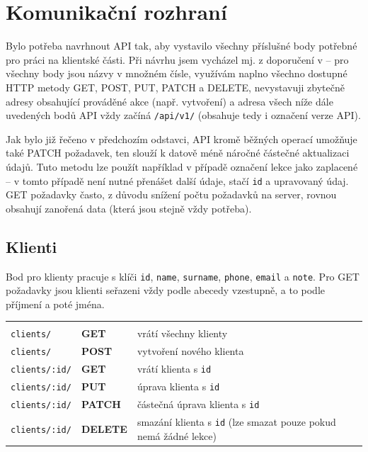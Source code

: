    \section{Komunikační rozhraní}
    Bylo potřeba navrhnout API tak, aby vystavilo všechny příslušné body potřebné pro práci na klientské části. Při návrhu jsem vycházel mj. z doporučení v \cite{api-bestpractises} -- pro všechny body jsou názvy v množném čísle, využívám naplno všechno dostupné HTTP metody GET, POST, PUT, PATCH a DELETE, nevystavuji zbytečně adresy obsahující prováděné akce (např. vytvoření) a adresa všech níže dále uvedených bodů API vždy začíná \verb|/api/v1/| (obsahuje tedy i označení verze API).
    
    Jak bylo již řečeno v předchozím odstavci, API kromě běžných operací umožňuje také PATCH požadavek, ten slouží k datově méně náročné částečné aktualizaci údajů. Tuto metodu lze použít například v případě označení lekce jako zaplacené -- v tomto případě není nutné přenášet další údaje, stačí \verb|id| a upravovaný údaj. GET požadavky často, z důvodu snížení počtu požadavků na server, rovnou obsahují zanořená data (která jsou stejně vždy potřeba).
    
    \newcommand{\apiA}{0.33}
    \newcommand{\apiB}{0.14}
    \newcommand{\apiC}{0.43}
    
        \subsection{Klienti}
        Bod pro klienty pracuje s klíči \verb|id|, \verb|name|, \verb|surname|, \verb|phone|, \verb|email| a \verb|note|.
        Pro GET požadavky jsou klienti seřazeni vždy podle abecedy vzestupně, a to podle příjmení a poté jména.
        
            {\centering
            \begin{tabular}{p{\apiA\textwidth}p{\apiB\textwidth}p{\apiC\textwidth}}&&\\
                \verb|clients/|             & \textbf{GET}      & vrátí všechny klienty\\
                \verb|clients/|             & \textbf{POST}     & vytvoření nového klienta\\
                \verb|clients/:id/|         & \textbf{GET}      & vrátí klienta s \verb|id|\\
                \verb|clients/:id/|         & \textbf{PUT}      & úprava klienta s \verb|id|\\
                \verb|clients/:id/|         & \textbf{PATCH}    & částečná úprava klienta s \verb|id|\\
                \verb|clients/:id/|         & \textbf{DELETE}   & smazání klienta s \verb|id| (lze smazat pouze pokud nemá žádné lekce)\\
            \end{tabular}}
            
